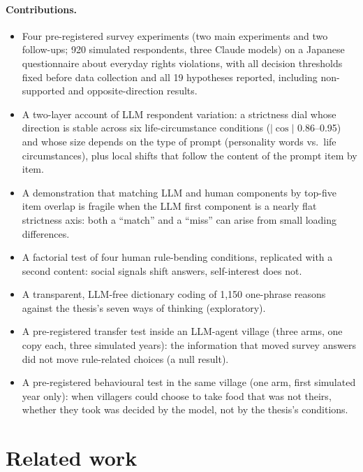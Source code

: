 \documentclass[11pt]{article}
\begin{document}
\paragraph{Contributions.}
\begin{itemize}
  \item Four pre-registered survey experiments (two main experiments and two follow-ups; 920 simulated respondents, three Claude models) on a Japanese questionnaire about everyday rights violations, with all decision thresholds fixed before data collection and all 19 hypotheses reported, including non-supported and opposite-direction results.
  \item A two-layer account of LLM respondent variation: a strictness dial whose direction is stable across six life-circumstance conditions ($|\cos|$ 0.86--0.95) and whose size depends on the type of prompt (personality words vs.\ life circumstances), plus local shifts that follow the content of the prompt item by item.
  \item A demonstration that matching LLM and human components by top-five item overlap is fragile when the LLM first component is a nearly flat strictness axis: both a ``match'' and a ``miss'' can arise from small loading differences.
  \item A factorial test of four human rule-bending conditions, replicated with a second content: social signals shift answers, self-interest does not.
  \item A transparent, LLM-free dictionary coding of 1{,}150 one-phrase reasons against the thesis's seven ways of thinking (exploratory).
  \item A pre-registered transfer test inside an LLM-agent village (three arms, one copy each, three simulated years): the information that moved survey answers did not move rule-related choices (a null result).
  \item A pre-registered behavioural test in the same village (one arm, first simulated year only): when villagers could choose to take food that was not theirs, whether they took was decided by the model, not by the thesis's conditions.
\end{itemize}

\section{Related work}
\end{document}
